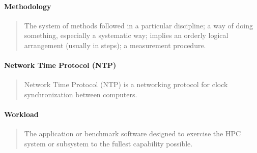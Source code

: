 \paragraph*{Methodology}
\begin{quote}
The system of methods followed in a particular discipline; a way of doing something, especially a systematic way; implies an orderly logical arrangement (usually in steps); a measurement procedure.
\end{quote}


\paragraph*{Network Time Protocol (NTP)}
\begin{quote}
Network Time Protocol (NTP) is a networking protocol for clock synchronization between computers.
\end{quote}

\paragraph*{Workload}
\begin{quote}
The application or benchmark software designed to exercise the HPC system or subsystem to
the fullest capability possible.
\end{quote}

